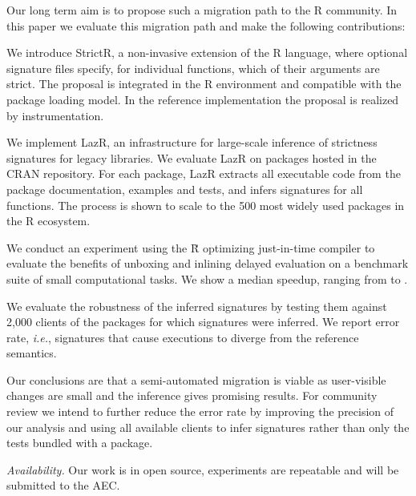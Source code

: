 \documentclass[review,nonacm,screen,acmsmall,anonymous=true]{acmart}
\newcommand{\strictr}{{\sf StrictR}\xspace}
\newcommand{\lazr}{{\sf LazR}\xspace}
\renewcommand{\Rsh}{{\sf\u R}\xspace}
\newcommand{\ie}{\emph{i.e.},\xspace}
\begin{document}
\medskip
\noindent Our long term aim is to propose such a migration path to the R community. In
this paper we evaluate this migration path and make the following contributions:
\vspace{1mm}

\begin{compactitem}[---]
\item We introduce \strictr, a non-invasive extension of the R language, where
  optional signature files specify, for individual functions, which of their
  arguments are strict. The proposal is integrated in the R environment and
  compatible with the package loading model. In the reference implementation the
  proposal is realized by instrumentation.
\item We implement \lazr, an infrastructure for large-scale inference of
  strictness signatures for legacy libraries. We evaluate \lazr on packages
  hosted in the CRAN repository. For each package, \lazr extracts all executable
  code from the package documentation, examples and tests, and infers signatures
  for all functions. The process is shown to scale to the 500 most widely used
  packages in the R ecosystem.
\item We conduct an experiment using the \Rsh optimizing just-in-time compiler
  to evaluate the benefits of unboxing and inlining delayed evaluation on a
  benchmark suite of small computational tasks. We show a median
  \speedupRshStrict speedup, ranging from \speedupRshStrictMin to
  \speedupRshStrictMax.
\item We evaluate the robustness of the inferred signatures by testing them
  against 2,000 clients of the packages for which signatures were inferred. We
  report \robustnesResult error rate, \ie signatures that cause executions to
  diverge from the reference semantics.

\end{compactitem}

\medskip

\noindent Our conclusions are that a semi-automated migration is viable as
user-visible changes are small and the inference gives promising results. For
community review we intend to further reduce the error rate by improving the
precision of our analysis and using all available clients to infer signatures
rather than only the tests bundled with a package.

{\small \medskip\noindent\emph{Availability.} Our work is in open source, experiments are
repeatable and will be submitted to the AEC.}
\end{document}
